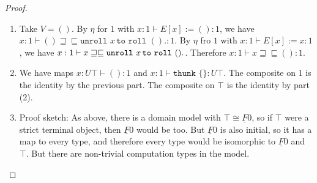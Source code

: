 \documentclass[acmsmall,screen,12pt]{acmart}
\renewcommand{\u}{\underline}
\newcommand{\ltdyn}{\sqsubseteq}
\newcommand{\gtdyn}{\sqsupseteq}
\newcommand{\equidyn}{\mathrel{\gtdyn\ltdyn}}
\newcommand{\roll}{\kw{roll}}
\newcommand{\kw}[1]{\texttt{#1}\,\,}
\newcommand{\pmmuXtoYinZ}[3]{\kw{unroll} #1 \,\kw{to} \roll #2. #3}
\newcommand{\thunk}{\kw{thunk}}
\begin{document}
\begin{longonly}
\begin{proof}
\begin{enumerate}
    \item Take $V = ()$.  By $\eta$ for $1$ with $x : 1 \vdash E[x] :=
      () : 1$, we have $x : 1 \vdash () \equidyn \pmmuXtoYinZ{x}{()} :
      1$.  By $\eta$ fro $1$ with $x : 1 \vdash E[x] := x : 1$, we have
      $x : 1 \vdash x \equidyn \pmmuXtoYinZ{x}{()}$.  Therefore $x : 1
      \vdash x \equidyn () : 1$.

    \item We have maps $x : U \top \vdash () : 1$ and $x : 1 \vdash
      \thunk{\{\}} : U \top$.  The composite on $1$ is the identity by
      the previous part.  The composite on $\top$ is the identity by
      part (2).

    \item Proof sketch: As above, there is a domain model with
      $\top \cong \u F 0$, so if $\top$ were a strict terminal object,
      then $\u F 0$ would be too.  But $\u F 0$ is also initial, so it
      has a map to every type, and therefore every type would be
      isomorphic to $\u F 0$ and $\top$.  But there are non-trivial
      computation types in the model.  
    \end{enumerate}
  \end{proof}
\end{longonly}
\end{document}
